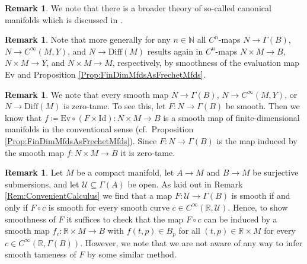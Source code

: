 \documentclass[12pt,a4paper]{article}
\theoremstyle{plain}
\theoremstyle{definition}
\newtheorem{remark}[theorem]{Remark}
\newcommand{\R}{\mathbb{R}}
\newcommand{\N}{\mathbb{N}}
\newcommand{\Diff}{\mathrm{Diff}(M)}
\newcommand{\Id}{\mathrm{Id}}
\newcommand{\Ev}{\mathrm{Ev}}
\newcommand{\Ucal}{\mathcal{U}}
\begin{document}
\begin{remark}
We note that there is a broader theory of so-called canonical manifolds which is discussed in \cite[2.3 Manifolds of Mappings]{schmeding_2022}.
\end{remark}

\begin{remark}
\label{Rem:C^nFamilies}
Note that more generally for any $n\in \N$ all $C^n$-maps $N\to \Gamma(B)$, $N\to C^\infty(M,Y)$, and $N\to \Diff$ results again in $C^n$-maps $N\times M\to B$, $N\times M\to Y$, and $N\times M\to M$, respectively, by smoothness of the evaluation map $\Ev$ and Proposition \ref{Prop:FinDimMfdsAsFrechetMfds}.
\end{remark}


\begin{remark}
We note that every smooth map $N\to \Gamma(B)$, $N\to C^\infty(M,Y)$, or $N\to \Diff$ is zero-tame. 
To see this, let $F:N\to \Gamma(B)$ be smooth. Then we know that $f\coloneqq\Ev\circ (F\times \Id):N\times M\to B$ is a smooth map of finite-dimensional manifolds in the conventional sense (cf.~Proposition \ref{Prop:FinDimMfdsAsFrechetMfds}). Since $F:N\to \Gamma(B)$ is the map induced by the smooth map $f:N\times M\to B$ it is zero-tame.
\end{remark}




\begin{remark}
\label{Remark:ConvCalcForMapOfSect}
Let $M$ be a compact manifold, let $A\to M$ and $B\to M$ be surjective submersions, and let $\Ucal\subseteq \Gamma(A)$ be open. As laid out in Remark \ref{Rem:ConvenientCalculus} we find that a map $F:\Ucal\to \Gamma(B)$ is smooth if and only if $F\circ c$ is smooth for every smooth curve $c\in C^\infty(\R,\Ucal)$. Hence, to show smoothness of $F$ it suffices to check that the map $F\circ c$ can be induced by a smooth map $f_c:\R\times M\to B$ with $f(t,p)\in B_p$ for all $(t,p)\in \R \times M$ for every $c\in C^\infty(\R,\Gamma(B))$. However, we note that we are not aware of any way to infer smooth tameness of $F$ by some similar method. 
\end{remark}
\end{document}
